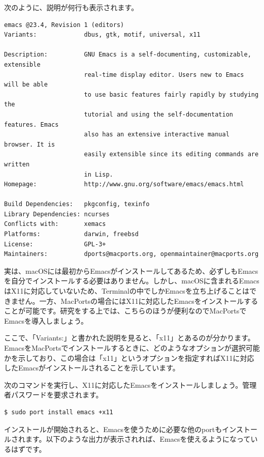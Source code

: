 次のように、説明が何行も表示されます。
\begin{lstlisting}
emacs @23.4, Revision 1 (editors)
Variants:             dbus, gtk, motif, universal, x11

Description:          GNU Emacs is a self-documenting, customizable, extensible
                      real-time display editor. Users new to Emacs will be able
                      to use basic features fairly rapidly by studying the
                      tutorial and using the self-documentation features. Emacs
                      also has an extensive interactive manual browser. It is
                      easily extensible since its editing commands are written
                      in Lisp.
Homepage:             http://www.gnu.org/software/emacs/emacs.html

Build Dependencies:   pkgconfig, texinfo
Library Dependencies: ncurses
Conflicts with:       xemacs
Platforms:            darwin, freebsd
License:              GPL-3+
Maintainers:          dports@macports.org, openmaintainer@macports.org
\end{lstlisting}

実は、macOSには最初からEmacsがインストールしてあるため、必ずしもEmacsを自分でインストールする必要はありません。しかし、macOSに含まれるEmacsはX11に対応していないため、Terminalの中でしかEmacsを立ち上げることはできません。一方、MacPortsの場合にはX11に対応したEmacsをインストールすることが可能です。研究をする上では、こちらのほうが便利なのでMacPortsでEmacsを導入しましょう。

ここで、「Variants:」と書かれた説明を見ると、「x11」とあるのが分かります。EmacsをMacPortsでインストールするときに、どのようなオプションが選択可能かを示しており、この場合は「x11」というオプションを指定すればX11に対応したEmacsがインストールされることを示しています。

次のコマンドを実行し、X11に対応したEmacsをインストールしましょう。管理者パスワードを要求されます。

\begin{lstlisting}[language=bash]
$ sudo port install emacs +x11
\end{lstlisting}

インストールが開始されると、Emacsを使うために必要な他のportもインストールされます。以下のような出力が表示されれば、Emacsを使えるようになっているはずです。


